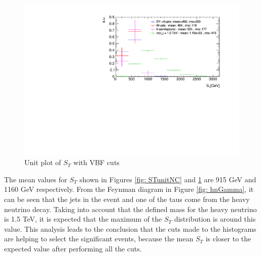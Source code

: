 \begin{figure}
\centering
\includegraphics[width=\linewidth]{Figures/Plots/ST_unitVBF.pdf}
\caption{Unit plot of $S_{T}$ with VBF cuts}
\label{fig: STunitVBF}
\end{figure}

The mean values for $S_{T}$ shown in Figures \ref{fig: STunitNC} and \ref{fig: STunitVBF} are 915 GeV and 1160 GeV respectively. From the Feynman diagram in Figure \ref{fig: hnGamma}, it can be seen that the jets in the event and one of the taus come from the heavy neutrino decay. Taking into account that the defined mass for the heavy neutrino is 1.5 TeV, it is expected that the maximum of the $S_{T}$ distribution is around this value. This analysis leads to the conclusion that the cuts made to the histograms are helping to select the significant events, because the mean $S_{T}$ is closer to the expected value after performing all the cuts.




